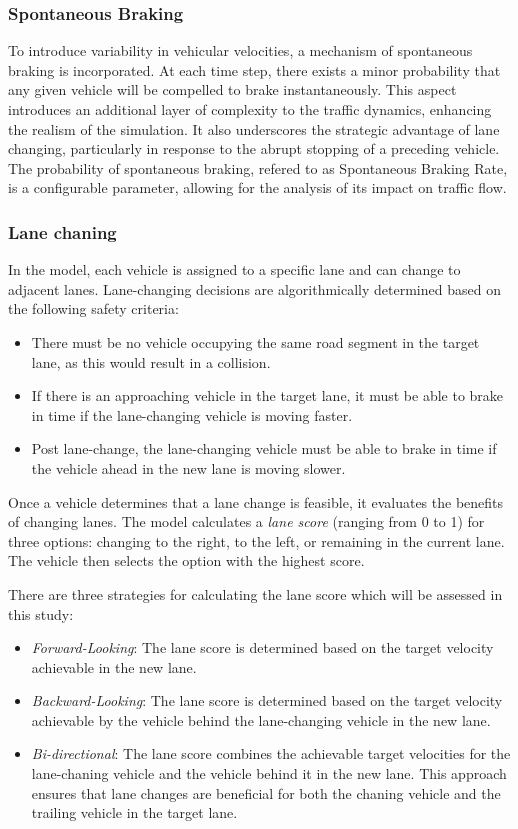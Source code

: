 \documentclass{article}
\begin{document}
\subsubsection{Spontaneous Braking}
To introduce variability in vehicular velocities, a mechanism of spontaneous braking is incorporated. At each time step, there exists a minor probability that any given vehicle will be compelled to brake instantaneously. This aspect introduces an additional layer of complexity to the traffic dynamics, enhancing the realism of the simulation. It also underscores the strategic advantage of lane changing, particularly in response to the abrupt stopping of a preceding vehicle. The probability of spontaneous braking, refered to as Spontaneous Braking Rate, is a configurable parameter, allowing for the analysis of its impact on traffic flow.

\subsubsection{Lane chaning}
In the model, each vehicle is assigned to a specific lane and can change to adjacent lanes. Lane-changing decisions are algorithmically determined based on the following safety criteria:
\begin{itemize}
\item There must be no vehicle occupying the same road segment in the target lane, as this would result in a collision.
\item If there is an approaching vehicle in the target lane, it must be able to brake in time if the lane-changing vehicle is moving faster.
\item Post lane-change, the lane-changing vehicle must be able to brake in time if the vehicle ahead in the new lane is moving slower.
\end{itemize}
Once a vehicle determines that a lane change is feasible, it evaluates the benefits of changing lanes. The model calculates a \textit{lane score} (ranging from 0 to 1) for three options: changing to the right, to the left, or remaining in the current lane. The vehicle then selects the option with the highest score.

There are three strategies for calculating the lane score which will be assessed in this study:
\begin{itemize}
\item \textit{Forward-Looking}: The lane score is determined based on the target velocity achievable in the new lane.
\item \textit{Backward-Looking}: The lane score is determined based on the target velocity achievable by the vehicle behind the lane-changing vehicle in the new lane.
\item \textit{Bi-directional}: The lane score combines the achievable target velocities for the lane-chaning vehicle and the vehicle behind it in the new lane. This approach ensures that lane changes are beneficial for both the chaning vehicle and the trailing vehicle in the target lane.
\end{itemize}
\end{document}
